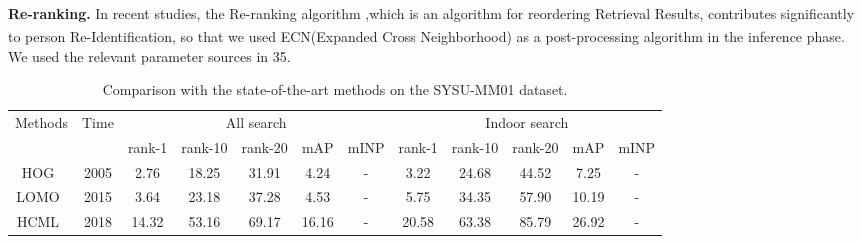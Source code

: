 \documentclass[journal]{IEEEtran}
\begin{document}
\textbf{Re-ranking.} 
In recent studies\textsuperscript{\cite{zhang2017alignedreid,basaran2020efficient,sarfraz2018pose}}, the Re-ranking algorithm ,which is an algorithm for reordering Retrieval Results, contributes significantly to person Re-Identification, so that we used ECN\textsuperscript{\cite{sarfraz2018pose}}(Expanded Cross Neighborhood) as a post-processing algorithm in the inference phase. We used the relevant parameter sources in 35.

\begin{table*}[]
	\centering
	\small 
	\caption{Comparison with the state-of-the-art methods on the SYSU-MM01 dataset.}
	\label{tab sysu}
	
	\begin{tabular}{c|c|ccccc|ccccc}
		\hline
		\multirow{2}{*}{Methods} & \multirow{2}{*}{Time} & \multicolumn{5}{c|}{All search}                                                                                                       & \multicolumn{5}{c}{Indoor search}                                                                                                     \\ \cline{3-12} 
		&                       & \multicolumn{1}{c|}{rank-1} & \multicolumn{1}{c|}{rank-10} & \multicolumn{1}{c|}{rank-20} & \multicolumn{1}{c|}{mAP} & mINP           & \multicolumn{1}{c|}{rank-1} & \multicolumn{1}{c|}{rank-10} & \multicolumn{1}{c|}{rank-20} & \multicolumn{1}{c|}{mAP} & mINP           \\ \hline
		HOG~\cite{dalal2005histograms}                      & 2005                  & 2.76                        & 18.25                        & 31.91                        & 4.24                     & -              & 3.22                        & 24.68                        & 44.52                        & 7.25                     & -              \\ \hline
		LOMO~\cite{liao2015person}                     & 2015                  & 3.64                        & 23.18                        & 37.28                        & 4.53                     & -              & 5.75                        & 34.35                        & 57.90                        & 10.19                    & -              \\ \hline
		HCML~\cite{ye2018hierarchical}                     & 2018                  & 14.32                       & 53.16                        & 69.17                        & 16.16                    & -              & 20.58                       & 63.38                        & 85.79                        & 26.92                    & -              \\

\end{tabular}
\end{table*}
\end{document}
